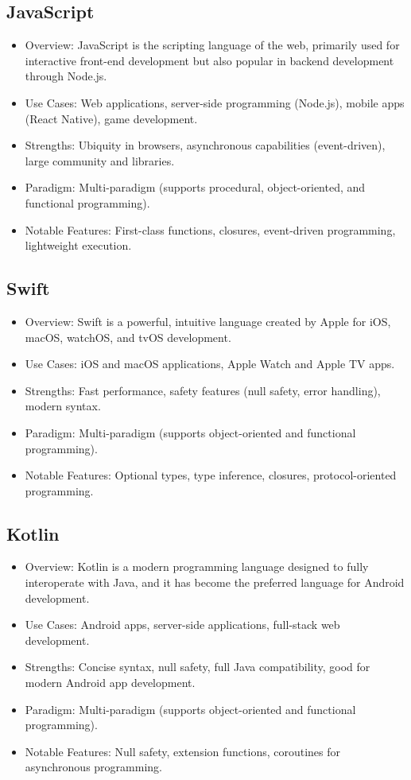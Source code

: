 \documentclass[openany]{book} %
\begin{document}
\subsection{JavaScript}
\begin{itemize}
\item Overview: JavaScript is the scripting language of the web, primarily used for interactive front-end development but also popular in backend development through Node.js.
\item Use Cases: Web applications, server-side programming (Node.js), mobile apps (React Native), game development.
\item Strengths: Ubiquity in browsers, asynchronous capabilities (event-driven), large community and libraries.
\item Paradigm: Multi-paradigm (supports procedural, object-oriented, and functional programming).
\item Notable Features: First-class functions, closures, event-driven programming, lightweight execution.
\end{itemize}

\subsection{Swift}
\begin{itemize}
\item Overview: Swift is a powerful, intuitive language created by Apple for iOS, macOS, watchOS, and tvOS development.
\item Use Cases: iOS and macOS applications, Apple Watch and Apple TV apps.
\item Strengths: Fast performance, safety features (null safety, error handling), modern syntax.
\item Paradigm: Multi-paradigm (supports object-oriented and functional programming).
\item Notable Features: Optional types, type inference, closures, protocol-oriented programming.
\end{itemize}

\subsection{Kotlin}
\begin{itemize}
\item Overview: Kotlin is a modern programming language designed to fully interoperate with Java, and it has become the preferred language for Android development.
\item Use Cases: Android apps, server-side applications, full-stack web development.
\item Strengths: Concise syntax, null safety, full Java compatibility, good for modern Android app development.
\item Paradigm: Multi-paradigm (supports object-oriented and functional programming).
\item Notable Features: Null safety, extension functions, coroutines for asynchronous programming.
\end{itemize}
\end{document}
